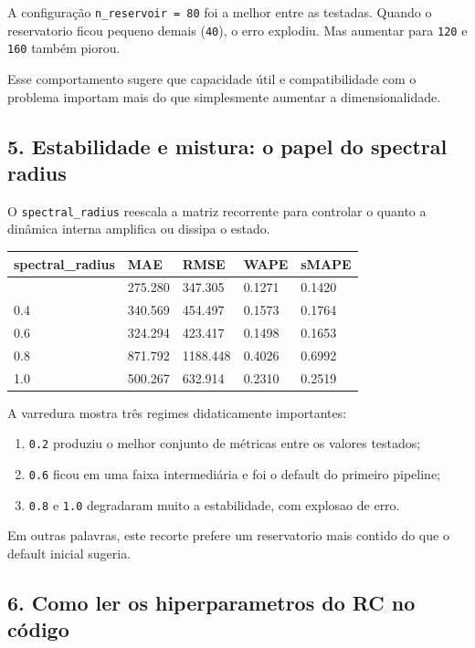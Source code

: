 \documentclass[12pt]{article}
\providecommand{\tightlist}{%
          \setlength{\itemsep}{0pt}\setlength{\parskip}{0pt}}
\begin{document}
A configuração \texttt{n\_reservoir\ =\ 80} foi a melhor entre as testadas. Quando o reservatorio ficou pequeno demais (\texttt{40}), o erro explodiu. Mas aumentar para \texttt{120} e \texttt{160} também piorou.

Esse comportamento sugere que capacidade útil e compatibilidade com o problema importam mais do que simplesmente aumentar a dimensionalidade.

\subsection{5. Estabilidade e mistura: o papel do spectral radius}\label{5-estabilidade-e-mistura-o-papel-do-spectral-radius}

O \texttt{spectral\_radius} reescala a matriz recorrente para controlar o quanto a dinâmica interna amplifica ou dissipa o estado.

\begin{longtable}[]{@{}lllll@{}}
\toprule\noalign{}
spectral\_radius & MAE & RMSE & WAPE & sMAPE \\
\midrule\noalign{}
\endhead
\bottomrule\noalign{}
\endlastfoot
0.2 & 275.280 & 347.305 & 0.1271 & 0.1420 \\
0.4 & 340.569 & 454.497 & 0.1573 & 0.1764 \\
0.6 & 324.294 & 423.417 & 0.1498 & 0.1653 \\
0.8 & 871.792 & 1188.448 & 0.4026 & 0.6992 \\
1.0 & 500.267 & 632.914 & 0.2310 & 0.2519 \\
\end{longtable}

A varredura mostra três regimes didaticamente importantes:

\begin{enumerate}
\def\labelenumi{\arabic{enumi}.}
\tightlist
\item
  \texttt{0.2} produziu o melhor conjunto de métricas entre os valores testados;
\item
  \texttt{0.6} ficou em uma faixa intermediária e foi o default do primeiro pipeline;
\item
  \texttt{0.8} e \texttt{1.0} degradaram muito a estabilidade, com explosao de erro.
\end{enumerate}

Em outras palavras, este recorte prefere um reservatorio mais contido do que o default inicial sugeria.

\subsection{6. Como ler os hiperparametros do RC no código}\label{6-como-ler-os-hiperparametros-do-rc-no-cuxf3digo}
\end{document}
